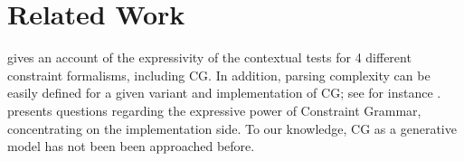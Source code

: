 \documentclass[11pt]{article}
\begin{document}
\section{Related Work}
 gives an account of the expressivity of
the contextual tests for 4 different constraint formalisms, including CG. 
In addition, parsing complexity can be easily defined for a given variant and 
implementation of CG; see for instance .
 presents questions regarding the expressive power
of Constraint Grammar, concentrating on the implementation side.
To our knowledge, CG as a generative model has not been been approached before.



\end{document}
